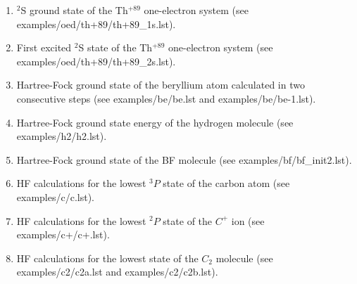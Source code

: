 \documentclass[12pt,a4paper]{article}
\begin{document}
\begin{enumerate}

\item $^2$S ground state of the Th$^{+89}$ one-electron system (see
  {examples/\-oed/\-th+89/\-th+89\-\_1s.\-lst}).

 



\item First excited $^2$S state of the Th$^{+89}$ one-electron
  system (see {examples/\-oed/\-th+89/\-th+89\-\_2s.\-lst}).

 

\newpage

\item \label{example-be} Hartree-Fock ground state of the beryllium atom calculated in
  two consecutive steps (see examples/\-be/\-be.lst and examples/\-be/\-be-1.lst). 

 




 
\newpage


\item Hartree-Fock ground state energy of the hydrogen molecule (see
  examples/h2/h2.lst). 

 

\item \label{example-bf} Hartree-Fock ground state of the BF molecule (see
  examples/bf/bf\_init2.lst).


 
\newpage
\item HF calculations for the lowest $^3P$ state of the carbon atom
  (see examples/c/c.lst).



\item HF calculations for the lowest $^2P$ state of the $C^+$ ion (see
  examples/c+/c+.lst).



\newpage
\item \label{example-c2a} HF calculations for the lowest state of the $C_2$ molecule (see
  examples/c2/c2a.lst and examples/c2/c2b.lst).




\end{enumerate}
\end{document}
